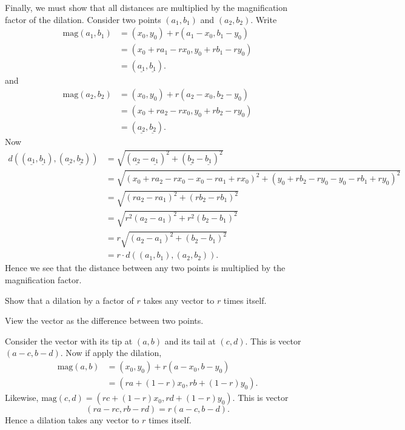 \documentclass[newpage,hints,handout,12pt,noauthor,nooutcomes]{ximera}
\begin{document}
\begin{problem}
\begin{freeResponse}
Finally, we must show that all distances are multiplied by the
magnification factor of the dilation. Consider two points $(a_1,b_1)$
and $(a_2,b_2)$.  Write
\begin{align*}
\mathrm{mag}(a_1,b_1) &= (x_0,y_0)+r(a_1-x_0,b_1-y_0)\\
&=(x_0+ra_1-rx_0,y_0+rb_1-ry_0)\\
&=(\underline{a_1},\underline{b_1}).
\end{align*}
and
\begin{align*}
\mathrm{mag}(a_2,b_2) &= (x_0,y_0)+r(a_2-x_0,b_2-y_0)\\
&=(x_0+ra_2-rx_0,y_0+rb_2-ry_0)\\
&=(\underline{a_2},\underline{b_2}).
\end{align*}
Now 
\begin{align*}
d((\underline{a_1},\underline{b_1}),(\underline{a_2},\underline{b_2})) &=
\sqrt{(\underline{a_2}-\underline{a_1})^2+(\underline{b_2}-\underline{b_1})^2} \\
&=\sqrt{(x_0+ra_2-rx_0-x_0-ra_1+rx_0)^2+(y_0+rb_2-ry_0-y_0-rb_1+ry_0)^2} \\
&=\sqrt{(ra_2-ra_1)^2+(rb_2-rb_1)^2} \\
&=\sqrt{r^2(a_2-a_1)^2+r^2(b_2-b_1)^2} \\
&=r\sqrt{(a_2-a_1)^2+(b_2-b_1)^2} \\
&=r\cdot d((a_1,b_1),(a_2,b_2)).
\end{align*}
Hence we see that the distance between any two points is multiplied by
the magnification factor.
\end{freeResponse}
\end{problem}

\begin{problem}
Show that a dilation by a factor of $r$ takes any vector to $r$
times itself.
\begin{hint}
View the vector as the difference between two points.
\end{hint}
\begin{freeResponse}
Consider the vector with its tip at $(a,b)$ and its tail at
$(c,d)$. This is vector $(a-c, b-d)$. Now if apply the dilation,
\begin{align*}
\mathrm{mag}(a,b) &= (x_0,y_0) + r(a-x_0, b-y_0)\\
&= (ra + (1-r)x_0, rb+(1-r)y_0).
\end{align*}
Likewise, $\mathrm{mag}(c,d) = (rc + (1-r)x_0, rd+(1-r)y_0)$. This is vector
\[
(ra-rc,rb-rd) = r(a-c,b-d).
\]
Hence a dilation takes any vector to $r$ times itself.
\end{freeResponse}
\end{problem}
\end{document}
